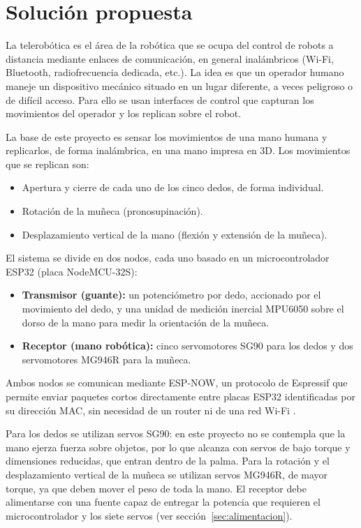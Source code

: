 \section{Solución propuesta}

La telerobótica es el área de la robótica que se ocupa del control de robots a distancia mediante enlaces de comunicación, en general inalámbricos (Wi-Fi, Bluetooth, radiofrecuencia dedicada, etc.). La idea es que un operador humano maneje un dispositivo mecánico situado en un lugar diferente, a veces peligroso o de difícil acceso. Para ello se usan interfaces de control que capturan los movimientos del operador y los replican sobre el robot.

La base de este proyecto es sensar los movimientos de una mano humana y replicarlos, de forma inalámbrica, en una mano impresa en 3D. Los movimientos que se replican son:

\begin{itemize}
    \item Apertura y cierre de cada uno de los cinco dedos, de forma individual.
    \item Rotación de la muñeca (pronosupinación).
    \item Desplazamiento vertical de la mano (flexión y extensión de la muñeca).
\end{itemize}

El sistema se divide en dos nodos, cada uno basado en un microcontrolador ESP32 (placa NodeMCU-32S):

\begin{itemize}
    \item \textbf{Transmisor (guante):} un potenciómetro por dedo, accionado por el movimiento del dedo, y una unidad de medición inercial MPU6050 sobre el dorso de la mano para medir la orientación de la muñeca.
    \item \textbf{Receptor (mano robótica):} cinco servomotores SG90 para los dedos y dos servomotores MG946R para la muñeca.
\end{itemize}

Ambos nodos se comunican mediante ESP-NOW, un protocolo de Espressif que permite enviar paquetes cortos directamente entre placas ESP32 identificadas por su dirección MAC, sin necesidad de un router ni de una red Wi-Fi \cite{espnow_idf}.

Para los dedos se utilizan servos SG90: en este proyecto no se contempla que la mano ejerza fuerza sobre objetos, por lo que alcanza con servos de bajo torque y dimensiones reducidas, que entran dentro de la palma. Para la rotación y el desplazamiento vertical de la muñeca se utilizan servos MG946R, de mayor torque, ya que deben mover el peso de toda la mano. El receptor debe alimentarse con una fuente capaz de entregar la potencia que requieren el microcontrolador y los siete servos (ver sección~\ref{sec:alimentacion}).

